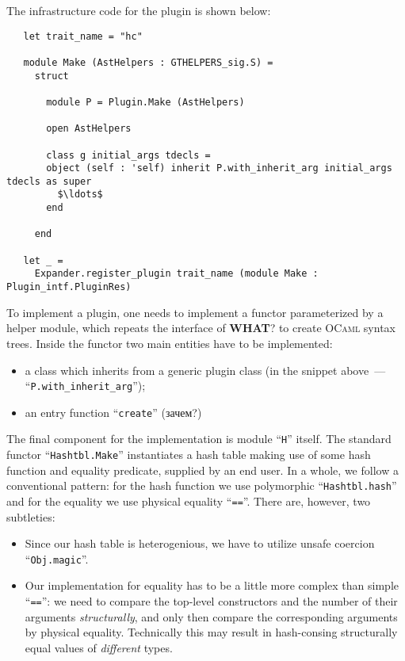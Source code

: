 The infrastructure code for the plugin is shown below:

\begin{lstlisting}
   let trait_name = "hc"
  
   module Make (AstHelpers : GTHELPERS_sig.S) =
     struct

       module P = Plugin.Make (AstHelpers)

       open AstHelpers

       class g initial_args tdecls =
       object (self : 'self) inherit P.with_inherit_arg initial_args tdecls as super
         $\ldots$
       end

     end

   let _ =
     Expander.register_plugin trait_name (module Make : Plugin_intf.PluginRes)
\end{lstlisting}

To implement a plugin, one needs to implement a functor parameterized by a helper module, which repeats the interface of \textbf{WHAT}? to create
\textsc{OCaml} syntax trees. Inside the functor two main entities have to be implemented:

\begin{itemize}
\item a class which inherits from a generic plugin class (in the snippet above~--- ``\lstinline{P.with_inherit_arg}'');
\item an entry function ``\lstinline{create}'' (зачем?)
\end{itemize}

The final component for the implementation is module ``\lstinline{H}'' itself. The standard functor ``\lstinline{Hashtbl.Make}'' instantiates a
hash table making use of some hash function and equality predicate, supplied by an end user. In a whole, we follow a conventional pattern:
for the hash function we use polymorphic ``\lstinline{Hashtbl.hash}'' and for the equality we use physical equality ``\lstinline{==}''. There are, however, two
subtleties:

\begin{itemize}
\item Since our hash table is heterogenious, we have to utilize unsafe coercion ``\lstinline{Obj.magic}''.
\item Our implementation for equality has to be a little more complex than simple ``\lstinline{==}'': we need to compare the top-level constructors and
  the number of their arguments \emph{structurally}, and only then compare the corresponding arguments by physical equality. Technically this
  may result in hash-consing structurally equal values of \emph{different} types.
\end{itemize}

